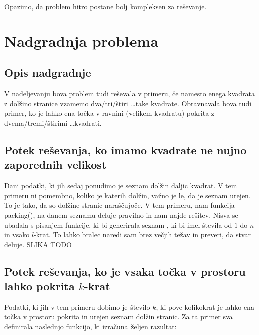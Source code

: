 \documentclass[a4paper, 11pt]{article}
\begin{document}
\noindent Opazimo, da problem hitro postane bolj kompleksen za reševanje.

\section{Nadgradnja problema}
\subsection{Opis nadgradnje}
V nadeljevanju bova problem tudi reševala v primeru, 
če namesto enega kvadrata z dolžino 
stranice vzamemo dva/tri/štiri \dots take kvadrate. 
Obravnavala bova tudi primer, ko je lahko ena točka v ravnini (velikem kvadratu) pokrita z 
dvema/tremi/štirimi \dots  kvadrati.
\subsection{Potek reševanja, ko imamo kvadrate ne nujno zaporednih velikost}
Dani podatki, ki jih sedaj ponudimo je seznam dolžin daljic kvadrat. V tem primeru ni 
pomembno, koliko je katerih dolžin, važno je le, da je seznam urejen. To je tako,
da so dolžine stranic naraščujoče.
V tem primeru, nam funkcija packing(), na danem seznamu deluje pravilno in nam najde rešitev.
Nisva se ubadala s pisanjem funkcije, ki bi generirala seznam , ki bi imel števila od 
$1$ do $n$ in vsako $l$-krat. To lahko bralec naredi sam brez večjih težav in preveri, da 
stvar deluje.
SLIKA TODO
\subsection{Potek reševanja, ko je vsaka točka v prostoru lahko pokrita $k$-krat}
Podatki, ki jih v tem primeru dobimo je število $k$,  ki pove kolikokrat je 
lahko ena točka v prostoru pokrita in urejen seznam dolžin stranic.
Za ta primer sva definirala naslednjo funkcijo, ki izračuna željen razultat:
\end{document}
